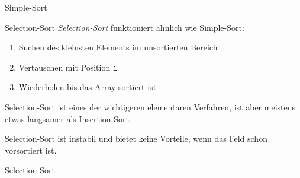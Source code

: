 \begin{code}{Simple-Sort}
    
\end{code}

\begin{algo}{Selection-Sort}
    \emph{Selection-Sort} funktioniert ähnlich wie Simple-Sort:
    \begin{enumerate}
        \item Suchen des kleinsten Elements im unsortierten Bereich
        \item Vertauschen mit Position \texttt{i}
        \item Wiederholen bis das Array sortiert ist
    \end{enumerate}

    Selection-Sort ist eines der wichtigeren elementaren Verfahren, ist aber meistens etwas langsamer als Insertion-Sort.

    Selection-Sort ist instabil und bietet keine Vorteile, wenn das Feld schon vorsortiert ist.
\end{algo}

\begin{code}{Selection-Sort}
    
\end{code}

